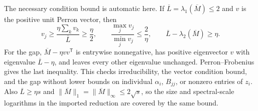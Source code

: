 \documentclass[11pt]{amsart}
\theoremstyle{definition}\newtheorem{definition}[theorem]{Definition}
\theoremstyle{remark}\newtheorem{remark}[theorem]{Remark}
\numberwithin{equation}{section}
\begin{document}
The necessary condition bound is automatic here.  If
$\overline L=\lambda_1(\overline M)\le2$ and $v$ is the positive unit
Perron vector, then
\begin{equation}\label{p:ridgebounds}
 v_j\ge\frac{\eta\sum_kv_k}{\overline L}\ge\frac\eta2,
 \qquad \frac{\max_jv_j}{\min_jv_j}\le\frac2\eta,
 \qquad \overline L-\lambda_2(\overline M)\ge\eta.
\end{equation}
For the gap, $\overline M-\eta vv^{\mathsf T}$ is entrywise nonnegative,
has positive eigenvector $v$ with eigenvalue $\overline L-\eta$, and
leaves every other eigenvalue unchanged.  Perron--Frobenius gives the
last inequality.  This checks irreducibility, the vector condition bound,
and the gap without lower bounds on individual $\alpha_i$, $B_{jj}$,
or nonzero entries of $z_i$.  Also $\overline L\ge\eta s$ and
$\|\overline M\|_1=\|\overline M\|_\infty\le2\sqrt{s}$,
so the size and spectral-scale logarithms in the imported reduction are
covered by the same bound.
\end{document}
